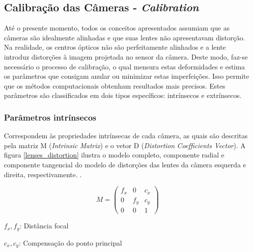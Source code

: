 \subsection{Calibração das Câmeras - \textit{Calibration}}
\label{theory_calib}

Até o presente momento, todos os conceitos apresentados assumiam que as câmeras são idealmente alinhadas e que suas lentes não apresentavam distorção. Na realidade, os centros ópticos não são perfeitamente alinhados e a lente introduz distorções à imagem projetada no sensor da câmera. Deste modo, faz-se necessário o processo de calibração, o qual mensura estas deformidades e estima os parâmetros que consigam anular ou minimizar estas imperfeições. Isso permite que os métodos computacionais obtenham resultados mais precisos. Estes parâmetros são classificados em dois tipos específicos: intrínsecos e extrínsecos.


\subsubsection{Parâmetros intrínsecos}

Correspondem às propriedades intrínsecas de cada câmera, as quais são descritas pela matriz M (\textit{Intrinsic Matrix}) e o vetor D (\textit{Distortion Coefficients Vector}). A figura \ref{lenses_distortion} ilustra o modelo completo, componente radial e componente tangencial do modelo de distorções das lentes da câmera esquerda e direita, respectivamente.
\cite{OpenCVCalibrationModule}.

\begin{equation}
 M = \begin{pmatrix}
f_x & 0   & c_x\\ 
  0 & f_y & c_y\\ 
  0 & 0   & 1
\end{pmatrix}
\end{equation}

\begin{center}
  $f_x,f_y$: Distância focal
  
  $c_x,c_y$: Compensação do ponto principal
\end{center}

